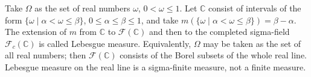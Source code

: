 Take $\Omega$ as the set of real numbers $\omega$, $0 < \omega \leq 1$. Let $\mathbb{C}$ consist of intervals of the form $\{\omega \mid \alpha < \omega \leq \beta\}$, $0 \leq \alpha \leq \beta \leq 1$, and take $m(\{\omega \mid \alpha < \omega \leq \beta\}) = \beta - \alpha$. The extension of $m$ from $\mathbb{C}$ to $\mathscr{F}(\mathbb{C})$ and then to the completed sigma-field $\mathscr{F}_c(\mathbb{C})$ is called Lebesgue measure. Equivalently, $\Omega$ may be taken as the set of all real numbers; then $\mathscr{F}(\mathbb{C})$ consists of the Borel subsets of the whole real line. Lebesgue measure on the real line is a sigma-finite measure, not a finite measure.
